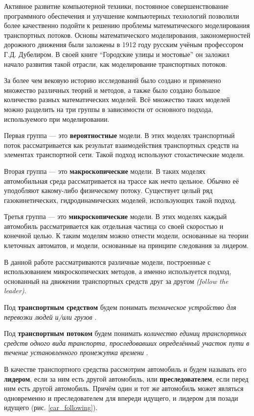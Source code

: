 \documentclass[12pt, a4paper]{extarticle}
\numberwithin{equation}{section}
\numberwithin{figure}{section}
\begin{document}
Активное развитие компьютерной техники, постоянное совершенствование программного обеспечения и улучшение компьютерных технологий позволили более качественно подойти к решению проблемы математического моделирования транспортных потоков. Основы математического моделирования, закономерностей дорожного движения были заложены в 1912 году русским учёным профессором Г.Д. Дубелиром. В своей книге ``Городские улицы и мостовые'' \cite{Street} он заложил начало развития такой отрасли, как моделирование транспортных потоков.

За более чем вековую историю исследований было создано и применено множество различных теорий и методов, а также было создано большое количество разных математических моделей. Всё множество таких моделей можно разделить на три группы в зависимости от основного подхода, используемого при моделировании.

Первая группа --- это \textbf{вероятностные} модели. В этих моделях транспортный поток рассматривается как результат взаимодействия транспортных средств на элементах транспортной сети.
Такой подход используют стохастические модели.

Вторая группа --- это \textbf{макроскопические} модели. В таких моделях автомобильная среда рассматривается на трассе как нечто цельное. Обычно её уподобляют какому-либо физическому потоку. Существует целый ряд газокинетических, гидродинамических моделей, использующих такой подход.

Третья группа --- это \textbf{микроскопические} модели. В этих моделях каждый автомобиль рассматривается как отдельная частица со своей скоростью и конечной целью. К таким моделям можно отнести модели, основанные на теории клеточных автоматов, и модели, основанные на принципе следования за лидером.

В данной работе рассматриваются различные модели, построенные с использованием микроскопических методов, а именно используется подход, основанный на движении транспортных средств друг за другом {\it(follow the leader)}.

Под \textbf{транспортным средством} будем понимать {\it техническое устройство для перевозки людей и/или грузов} \cite{TrafficFlow}.

Под \textbf{транспортным потоком} будем понимать {\it количество единиц транспортных средств одного вида транспорта, проследовавших определённый участок пути в течение установленного промежутка времени} \cite{TrafficFlow}.

В качестве транспортного средства рассмотрим автомобиль и будем называть его \textbf{лидером}, если за ним есть другой автомобиль, или \textbf{преследователем}, если перед ним есть другой автомобиль. Причём один и тот же автомобиль может являться одновременно и преследователем для впереди идущего, и лидером для позади идущего (рис. \ref{car_following}). 
\end{document}
